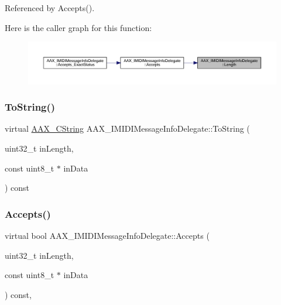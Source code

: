 Referenced by Accepts().

Here is the caller graph for this function\+:
\nopagebreak
\begin{figure}[H]
\begin{center}
\leavevmode
\includegraphics[width=350pt]{a01953_a7e4bb6faf47d70dbefcdde952dd76e1c_icgraph}
\end{center}
\end{figure}
\mbox{\label{a01953_ace3e3e5900288bd6de7dd2612a57afc2}} 
\subsubsection{\texorpdfstring{ToString()}{ToString()}}
{\footnotesize\ttfamily virtual \mbox{\hyperlink{a01573}{A\+A\+X\+\_\+\+C\+String}} A\+A\+X\+\_\+\+I\+M\+I\+D\+I\+Message\+Info\+Delegate\+::\+To\+String (\begin{DoxyParamCaption}\item[{uint32\+\_\+t}]{in\+Length,  }\item[{const uint8\+\_\+t $\ast$}]{in\+Data }\end{DoxyParamCaption}) const\hspace{0.3cm}{\ttfamily [pure virtual]}}

\mbox{\label{a01953_a293e390875d91b5dc0ff51e847aa886c}} 
\subsubsection{\texorpdfstring{Accepts()}{Accepts()}}
{\footnotesize\ttfamily virtual bool A\+A\+X\+\_\+\+I\+M\+I\+D\+I\+Message\+Info\+Delegate\+::\+Accepts (\begin{DoxyParamCaption}\item[{uint32\+\_\+t}]{in\+Length,  }\item[{const uint8\+\_\+t $\ast$}]{in\+Data }\end{DoxyParamCaption}) const\hspace{0.3cm}{\ttfamily [inline]}, {\ttfamily [virtual]}}



